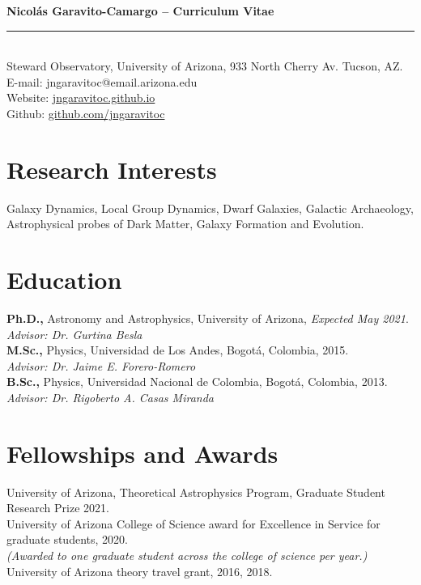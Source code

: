 \documentclass[UTF8]{article}
\begin{document}
\indent \textbf{\LARGE Nicol\'as Garavito-Camargo -- Curriculum Vitae} \\
\indent \rule{17cm}{0.4pt}\\

\noindent Steward Observatory, University of Arizona, 933 North Cherry Av. Tucson, AZ.\\
E-mail: jngaravitoc@email.arizona.edu\\ 
Website: \href{http://jngaravitoc.github.io/Garavito-Camargo}{jngaravitoc.github.io}\\
Github: \href{http://www.github.com/jngaravitoc}{github.com/jngaravitoc}\\
\section*{Research Interests}
Galaxy Dynamics, Local Group Dynamics, Dwarf Galaxies, Galactic
Archaeology, Astrophysical probes of Dark Matter, Galaxy Formation and Evolution.

\section*{Education}
\textbf{Ph.D.,} Astronomy and Astrophysics, University of Arizona, \textit{Expected May 2021}.\\
\indent \textit{Advisor: Dr. Gurtina Besla}\\
\textbf{M.Sc.,}  Physics, Universidad de Los Andes, Bogot\'a, Colombia, 2015.\\
\indent \textit{Advisor: Dr. Jaime E. Forero-Romero}\\
\textbf{B.Sc.,} Physics, Universidad Nacional de Colombia, Bogot\'a, Colombia, 2013.\\
\indent \textit{Advisor: Dr. Rigoberto A. Casas Miranda}

\section*{Fellowships and Awards}

University of Arizona, Theoretical Astrophysics Program, Graduate Student
Research Prize 2021.\\
University of Arizona College of Science award for Excellence in
Service for graduate students, 2020. \\
\indent \textit{(Awarded to one graduate student across the college of
science per year.)}\\
University of Arizona theory travel grant, 2016, 2018. \\
\end{document}
